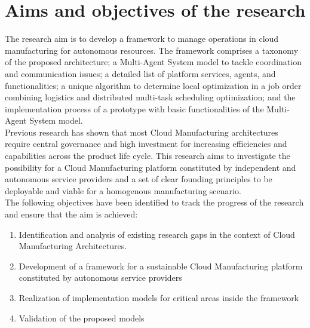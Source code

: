\section{Aims and objectives of the research}
The research aim is to develop a framework to manage operations in cloud manufacturing for autonomous resources. The framework comprises a taxonomy of the proposed architecture; a Multi-Agent System model to tackle coordination and communication issues; a detailed list of platform services, agents, and functionalities; a unique algorithm to determine local optimization in a job order combining logistics and distributed multi-task scheduling optimization; and the implementation process of a prototype with basic functionalities of the Multi-Agent System model.\\
Previous research has shown that most Cloud Manufacturing architectures require central governance and high investment for increasing efficiencies and capabilities across the product life cycle. This research aims to investigate the possibility for a Cloud Manufacturing platform constituted by independent and autonomous service providers and a set of clear founding principles to be deployable and viable for a homogenous manufacturing scenario.\\
The following objectives have been identified to track the progress of the research and ensure that the aim is achieved:
\begin{enumerate}
    \item Identification and analysis of existing research gaps in the context of Cloud Manufacturing Architectures.
    \item Development of a framework for a sustainable Cloud Manufacturing platform constituted by autonomous service providers
    \item Realization of implementation models for critical areas inside the framework
    \item Validation of the proposed models
\end{enumerate}
